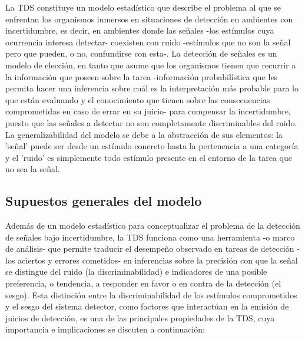 La TDS constituye un modelo estadístico que describe el problema al que se enfrentan los organismos inmersos en situaciones de detección en ambientes con incertidumbre, es decir, en ambientes donde las señales -los estímulos cuya ocurrencia interesa detectar- coexisten con ruido -estímulos que no son la señal pero que pueden, o no, confundirse con esta-. La detección de señales es un modelo de elección, en tanto que asume que los organismos tienen que recurrir a la información que poseen sobre la tarea -información probabilística que les permita hacer una inferencia sobre cuál es la interpretación más probable para lo que están evaluando y el conocimiento que tienen sobre las consecuencias comprometidas en caso de errar en su juicio- para compensar la incertidumbre, puesto que las señales a detectar no son completamente discriminables del ruido. La generalizabilidad del modelo se debe a la abstracción de sus elementos: la 'señal' puede ser desde un estímulo concreto hasta la pertenencia a una categoría y el 'ruido' es simplemente todo estímulo presente en el entorno de la tarea que no sea la señal.\\ 

\subsection{Supuestos generales del modelo}

Además de un modelo estadístico para conceptualizar el problema de la detección de señales bajo incertidumbre, la TDS funciona como una herramienta -o marco de análisis- que permite traducir el desempeño observado en tareas de detección -los aciertos y errores cometidos- en inferencias sobre la precisión con que la señal se distingue del ruido (la discriminabilidad) e indicadores de una posible preferencia, o tendencia, a responder en favor o en contra de la detección (el sesgo). Esta distinción entre la discriminabilidad de los estímulos comprometidos y el sesgo del sistema detector, como factores que interactúan en la emisión de juicios de detección, es una de las principales propiedades de la TDS, cuya importancia e implicaciones se discuten a continuación:\\

